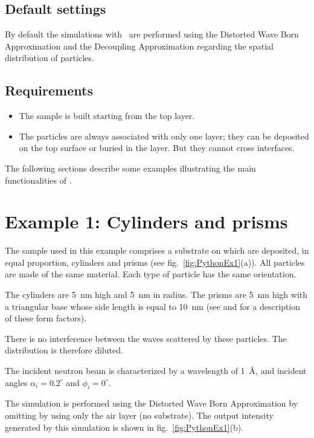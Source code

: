 \subsection{Default settings}
By default the simulations with \BornAgain\ are performed using the Distorted Wave Born Approximation and the Decoupling Approximation regarding the spatial distribution of particles.


\subsection{Requirements}
\begin{itemize}
  \item The sample is built starting from the top layer.
  \item The particles are always associated with only one layer; they can be deposited on the top surface or buried in the layer. But they cannot cross interfaces.
\end{itemize}
The following sections describe some examples illustrating the main functionalities of \BornAgain .


\newpage
\section{Example 1: Cylinders and prisms}
The sample used in this example comprises a substrate on which are deposited, in equal proportion, cylinders and prisms (see fig.~\ref{fig:PythonEx1}(a)). All particles are made of the same material. Each type of particle has the same orientation.

The cylinders are 5~nm high and 5~nm in radius. The prisms are 5~nm high with a triangular base whose side length is equal to 10~nm (see  and  for a description of these form factors). 

There is no interference between the waves scattered by these particles. The distribution is therefore diluted.

The incident neutron beam is characterized by a wavelength of 1~\AA, and incident angles $\alpha_i=0.2^{\circ}$ and $\phi_i=0^{\circ}$.

The simulation is performed using the Distorted Wave Born Approximation by omitting by using only the air layer (no substrate). The output intensity generated by this simulation is shown in fig.~\ref{fig:PythonEx1}(b).

